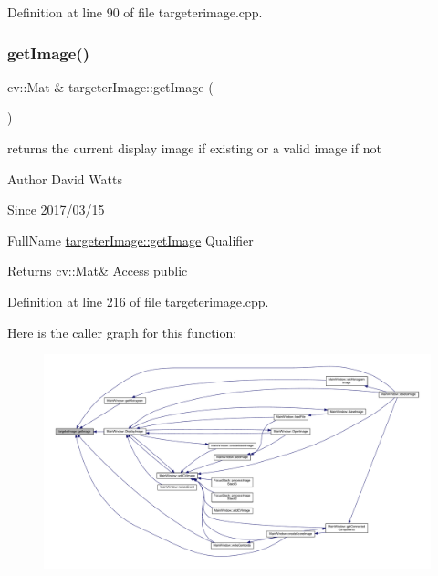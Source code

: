 Definition at line 90 of file targeterimage.\+cpp.

\mbox{\label{classtargeter_image_a2a66aadfba8fe64dfde9725bde71808c}} 
\subsubsection{\texorpdfstring{get\+Image()}{getImage()}}
{\footnotesize\ttfamily cv\+::\+Mat \& targeter\+Image\+::get\+Image (\begin{DoxyParamCaption}{ }\end{DoxyParamCaption})}

returns the current display image if existing or a valid image if not

\begin{DoxyAuthor}{Author}
David Watts 
\end{DoxyAuthor}
\begin{DoxySince}{Since}
2017/03/15
\end{DoxySince}
Full\+Name \hyperlink{classtargeter_image_a2a66aadfba8fe64dfde9725bde71808c}{targeter\+Image\+::get\+Image} Qualifier \begin{DoxyReturn}{Returns}
cv\+::\+Mat\& Access public 
\end{DoxyReturn}


Definition at line 216 of file targeterimage.\+cpp.

Here is the caller graph for this function\+:
\nopagebreak
\begin{figure}[H]
\begin{center}
\leavevmode
\includegraphics[width=350pt]{classtargeter_image_a2a66aadfba8fe64dfde9725bde71808c_icgraph}
\end{center}
\end{figure}
\mbox{\label{classtargeter_image_a92b7c1e3195bc50b112fc67f161b9723}} 
